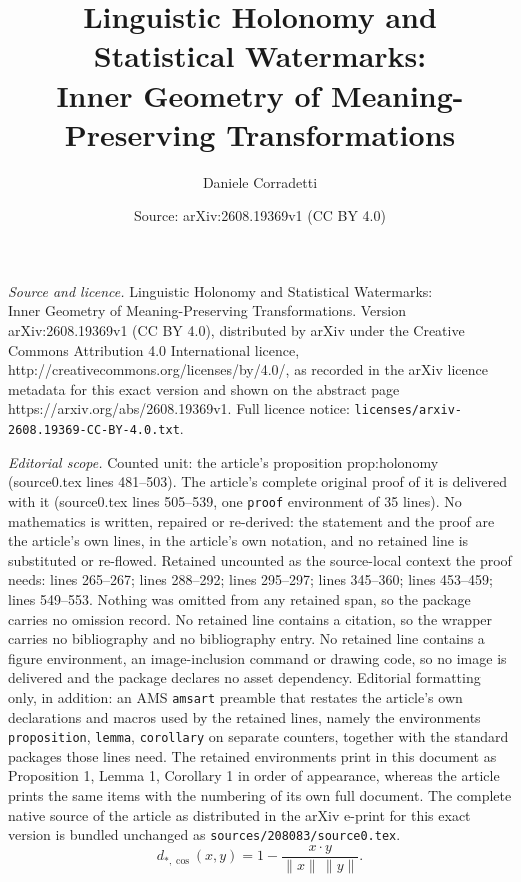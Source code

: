 \documentclass[10pt,a4paper]{amsart}
\title{Linguistic Holonomy and Statistical Watermarks:\\ Inner Geometry of Meaning-Preserving Transformations}
\author{Daniele Corradetti}
\date{Source: arXiv:2608.19369v1 (CC BY 4.0)}
\begin{document}
\maketitle

\noindent\emph{Source and licence.} Linguistic Holonomy and Statistical Watermarks:\\ Inner Geometry of Meaning-Preserving Transformations. Version arXiv:2608.19369v1 (CC BY 4.0), distributed by arXiv under the Creative Commons Attribution 4.0 International licence, http://creativecommons.org/licenses/by/4.0/, as recorded in the arXiv licence metadata for this exact version and shown on the abstract page https://arxiv.org/abs/2608.19369v1. Full licence notice: \texttt{licenses/arxiv-2608.19369-CC-BY-4.0.txt}.\par\smallskip

\noindent\textit{Editorial scope.} Counted unit: the article's proposition prop:holonomy (source0.tex lines 481--503). The article's complete original proof of it is delivered with it (source0.tex lines 505--539, one \texttt{proof} environment of 35 lines). No mathematics is written, repaired or re-derived: the statement and the proof are the article's own lines, in the article's own notation, and no retained line is substituted or re-flowed.  Retained uncounted as the source-local context the proof needs: lines 265--267; lines 288--292; lines 295--297; lines 345--360; lines 453--459; lines 549--553.  Nothing was omitted from any retained span, so the package carries no omission record.  No retained line contains a citation, so the wrapper carries no bibliography and no bibliography entry.  No retained line contains a figure environment, an image-inclusion command or drawing code, so no image is delivered and the package declares no asset dependency.  Editorial formatting only, in addition: an AMS \texttt{amsart} preamble that restates the article's own declarations and macros used by the retained lines, namely the environments \texttt{proposition}, \texttt{lemma}, \texttt{corollary} on separate counters, together with the standard packages those lines need.  The retained environments print in this document as Proposition 1, Lemma 1, Corollary 1 in order of appearance, whereas the article prints the same items with the numbering of its own full document.  The complete native source of the article as distributed in the arXiv e-print for this exact version is bundled unchanged as \texttt{sources/208083/source0.tex}.
\begin{equation}\label{eq:cosine}
d_{*,\cos}(x,y) = 1 - \frac{x\cdot y}{\|x\|\,\|y\|}.
\end{equation}
\end{document}
